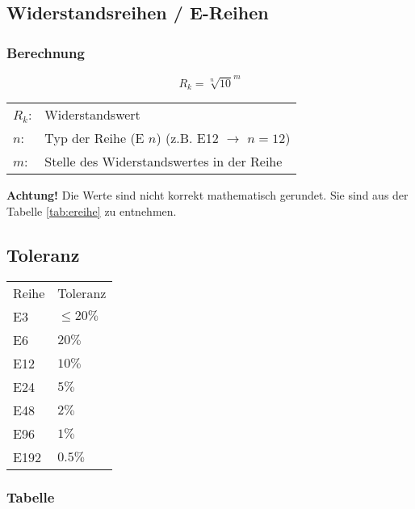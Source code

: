 



\subsection{Widerstandsreihen / E-Reihen}
\subsubsection{Berechnung}
\[ R_k = {\sqrt[n]{10}}^m \]
\begin{tabular}{@{}ll}
$R_k$: & Widerstandswert \\
$n$:   & Typ der Reihe (E $n$) (z.B. E12 $\rightarrow$ $n=12$) \\
$m$:   & Stelle des Widerstandswertes in der Reihe \\
\end{tabular}
\textbf{Achtung!} Die Werte sind nicht korrekt mathematisch gerundet. Sie sind 
aus der Tabelle \ref{tab:ereihe} zu entnehmen. 

\subsection{Toleranz}
\begin{tabular}{ll}
Reihe & Toleranz \\
E3   & $\leq20\%$ \\
E6   & $20\%$ \\
E12  & $10\%$ \\
E24  & $5\%$ \\
E48  & $2\%$ \\
E96  & $1\%$ \\
E192 & $0.5\%$ \\
\end{tabular}

\subsubsection{Tabelle}
